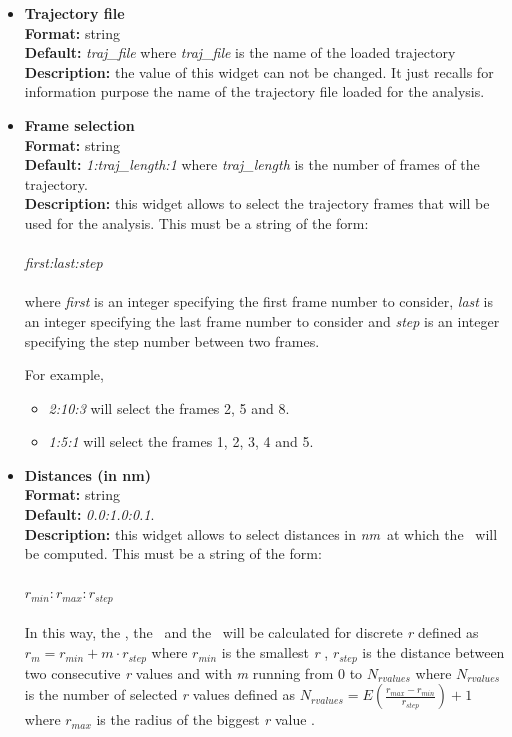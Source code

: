 \documentclass[a4paper,11pt]{report}
\newcommand{\nm}{\textit{nm}}
\begin{document}
\begin{itemize}
\item \textbf{Trajectory file}\\
\textbf{Format:} string\\
\textbf{Default:} \textit{traj\_file} where \textit{traj\_file} is the name of the loaded trajectory\\
\textbf{Description:} the value of this widget can not be changed. It just recalls for information purpose the name
of the trajectory file loaded for the analysis.

\item \textbf{Frame selection}\\
\textbf{Format:} string\\
\textbf{Default:} \textit{1:traj\_length:1} where \textit{traj\_length} is the number of frames of the trajectory.\\
\textbf{Description:} this widget allows to select the trajectory frames that will be used for the analysis. This must
be a string of the form:
\\\\
\textit{first:last:step}
\\\\
where \textit{first} is an integer specifying the first frame number to consider, \textit{last} is an integer specifying the last 
frame number to consider and \textit{step} is an integer specifying the step number between two frames.

For example,
\begin{itemize}
\item \textit{2:10:3} will select the frames 2, 5 and 8.
\item \textit{1:5:1} will select the frames 1, 2, 3, 4 and 5.
\end{itemize}

\item \textbf{Distances (in nm)}\\
\textbf{Format:} string\\
\textbf{Default:} \textit{0.0:1.0:0.1}.\\
\textbf{Description:} this widget allows to select distances in \nm\ at which the \PDF\ will be computed. This must
be a string of the form:
\\\\
$r_{min}:r_{max}:r_{step}$
\\\\
In this way, the \PDF , the \RDF\ and the \TCF\ will be calculated for discrete \textit{r} defined as 
$r_m = r_{min} + m \cdot r_{step}$ where $r_{min}$ is the smallest \textit{r} , $r_{step}$ is the 
distance between two consecutive \textit{r} values and with \textit{m} running from 0 to $N_{rvalues}$ 
where $N_{rvalues}$ is the number of selected \textit{r} values defined as 
$N_{rvalues}= E(\frac{r_{max} - r_{min}}{r_{step}}) + 1$ where $r_{max}$ is the 
radius of the biggest \textit{r} value .


\end{itemize}
\end{document}
